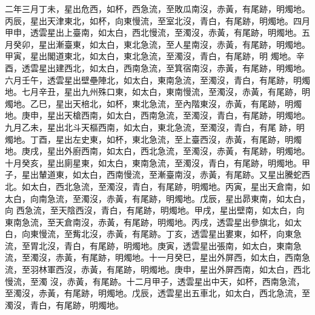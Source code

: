 \begin{pinyinscope}
 二年三月丁未，星出危西，如杯，西急流，至敗瓜南沒，赤黃，有尾跡，明燭地。丙辰，星出天津東北，如杯，向東慢流，至室北沒，青白，有尾跡，明燭地。四月甲申，透雲星出上臺南，如太白，西北慢流，至濁沒，赤黃，有尾跡，明燭地。五月癸卯，星出漸臺東，如太白，東北急流，至人星南沒，赤黃，有尾跡，明燭地。甲寅，星出閣道東北，如太白，東北急流，至濁沒，青白，有尾跡，明
 燭地。辛酉，透雲星出建西北，如太白，西南急流，至箕宿南沒，赤黃，有尾跡，明燭地。六月壬午，透雲星出壁壘陣北，如太白，東南急流，至濁沒，青白，有尾跡，明燭地。七月辛丑，星出九州殊口東，如太白，東南慢流，至濁沒，赤黃，有尾跡，明燭地。乙巳，星出天棓北，如杯，東北急流，至內階東沒，赤黃，有尾跡，明燭地。庚申，星出天槍西南，如太白，西南急流，至濁沒，青白，有尾跡，明燭地。九月乙未，星出北斗天樞西南，如太白，東北急流，至濁沒，青白，有尾
 跡，明燭地。丁酉，星出左史東，如杯，東北急流，至上臺西沒，赤黃，有尾跡，明燭地。庚戌，星出外廚西南，如太白，西北急流，至濁沒，赤黃，有尾跡，明燭地。十月癸亥，星出廁星東，如太白，東南急流，至濁沒，青白，有尾跡，明燭地。甲子，星出輦道東，如太白，西南慢流，至漸臺南沒，赤黃，有尾跡。又星出騰蛇西北。如太白，西北急流，至濁沒，青白，有尾跡，明燭地。丙寅，星出天倉南，如太白，向南急流，至濁沒，赤黃，有尾跡，明燭地。戊辰，星出昴東南，如太白，向
 西急流，至天陰西沒，青白，有尾跡，明燭地。甲戌，星出壁南，如太白，向東南急流，至天倉南沒，赤黃，有尾跡，明燭地。丙戌，透雲星出參旗北，如太白，向東慢流，至觜北沒，赤黃，有尾跡。丁亥，透雲星出婁東，如杯，向東急流，至胃北沒，青白，有尾跡，明燭地。庚寅，透雲星出張南，如太白，東南急流，至濁沒，赤黃，有尾跡，明燭地。十一月癸巳，星出外屏西，如太白，西南急流，至羽林軍西沒，赤黃，有尾跡，明燭地。庚申，星出外屏西南，如太白，西北慢流，至濁
 沒，赤黃，有尾跡。十二月甲子，透雲星出中天，如杯，西南急流，至濁沒，赤黃，有尾跡，明燭地。戊辰，透雲星出五車北，如太白，西北急流，至濁沒，青白，有尾跡，明燭地。




\end{pinyinscope}
